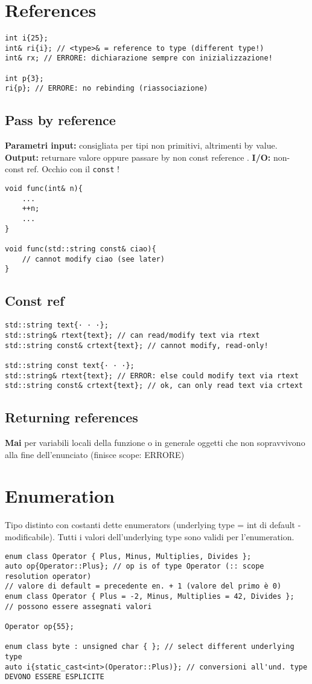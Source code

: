 \documentclass[10pt, oneside]{Book}
\begin{document}
\section{References}
\begin{verbatim}
int i{25};
int& ri{i}; // <type>& = reference to type (different type!)
int& rx; // ERRORE: dichiarazione sempre con inizializzazione!

int p{3};
ri{p}; // ERRORE: no rebinding (riassociazione)
\end{verbatim}
\subsection{Pass by reference}
\textbf{Parametri input:} consigliata per tipi non primitivi, altrimenti by value. \textbf{Output: } returnare valore oppure passare by non const reference . \textbf{I/O: } non-const ref. Occhio con il \texttt{const} !
\begin{verbatim}
void func(int& n){
    ...
    ++n;
    ...
}

void func(std::string const& ciao){
    // cannot modify ciao (see later)
}
\end{verbatim}
\subsection{Const ref}
\begin{verbatim}
std::string text{· · ·};
std::string& rtext{text}; // can read/modify text via rtext
std::string const& crtext{text}; // cannot modify, read-only!

std::string const text{· · ·};
std::string& rtext{text}; // ERROR: else could modify text via rtext
std::string const& crtext{text}; // ok, can only read text via crtext
\end{verbatim}
\subsection{Returning references}
\textbf{Mai} per variabili locali della funzione o in generale oggetti che non sopravvivono alla fine dell'enunciato (finisce scope: ERRORE)

\section{Enumeration}
Tipo distinto con costanti dette enumerators (underlying type = int di default - modificabile). Tutti i valori dell'underlying type sono validi per l'enumeration.
\begin{verbatim}
enum class Operator { Plus, Minus, Multiplies, Divides };
auto op{Operator::Plus}; // op is of type Operator (:: scope resolution operator)
// valore di default = precedente en. + 1 (valore del primo è 0)
enum class Operator { Plus = -2, Minus, Multiplies = 42, Divides }; 
// possono essere assegnati valori

Operator op{55};

enum class byte : unsigned char { }; // select different underlying type
auto i{static_cast<int>(Operator::Plus)}; // conversioni all'und. type DEVONO ESSERE ESPLICITE
\end{verbatim}
\end{document}
